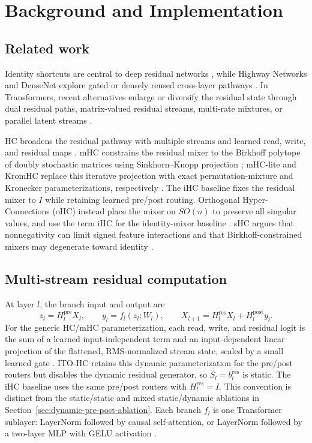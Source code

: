 \documentclass{article}
\newcommand{\Hpre}{H^{\mathrm{pre}}}
\newcommand{\Hpost}{H^{\mathrm{post}}}
\newcommand{\Hres}{H^{\mathrm{res}}}
\begin{document}
\section{Background and Implementation}

\subsection{Related work}
Identity shortcuts are central to deep residual networks \citep{he2016deep,he2016identity}, while Highway Networks and DenseNet explore gated or densely reused cross-layer pathways \citep{srivastava2015highway,huang2017densely}. In Transformers, recent alternatives enlarge or diversify the residual state through dual residual paths, matrix-valued residual streams, multi-rate mixtures, or parallel latent streams \citep{xie2023residual,mak2025residual,bhendawade2025m2r2,liu2025thoughtbubbles}.

HC broadens the residual pathway with multiple streams and learned read, write, and residual maps \citep{zhu2024hyper}. mHC constrains the residual mixer to the Birkhoff polytope of doubly stochastic matrices using Sinkhorn--Knopp projection \citep{xie2026mhc}; mHC-lite and KromHC replace this iterative projection with exact permutation-mixture and Kronecker parameterizations, respectively \citep{yang2026mhclite,zhou2026kromhc}. The iHC baseline fixes the residual mixer to $I$ while retaining learned pre/post routing. Orthogonal Hyper-Connections (oHC) instead place the mixer on $SO(n)$ to preserve all singular values, and use the term iHC for the identity-mixer baseline \citep{guo2026ohc}. sHC argues that nonnegativity can limit signed feature interactions and that Birkhoff-constrained mixers may degenerate toward identity \citep{liu2026shc}.

\subsection{Multi-stream residual computation}
At layer $l$, the branch input and output are
\begin{equation}
 z_l=\Hpre_l X_l,\qquad y_l=f_l(z_l;W_l),\qquad
 X_{l+1}=\Hres_lX_l+\Hpost_l y_l.
 \label{eq:update}
\end{equation}
For the generic HC/mHC parameterization, each read, write, and residual logit is the sum of a learned input-independent term and an input-dependent linear projection of the flattened, RMS-normalized stream state, scaled by a small learned gate \citep{zhang2019rmsnorm,zhu2024hyper,xie2026mhc}. ITO-HC retains this dynamic parameterization for the pre/post routers but disables the dynamic residual generator, so $S_l=b_l^{\mathrm{res}}$ is static. The iHC baseline uses the same pre/post routers with $\Hres_l=I$. This convention is distinct from the static/static and mixed static/dynamic ablations in Section~\ref{sec:dynamic-pre-post-ablation}.
Each branch $f_l$ is one Transformer sublayer: LayerNorm followed by causal self-attention, or LayerNorm followed by a two-layer MLP with GELU activation \citep{ba2016layer,vaswani2017attention,hendrycks2016gelu}.
\end{document}
